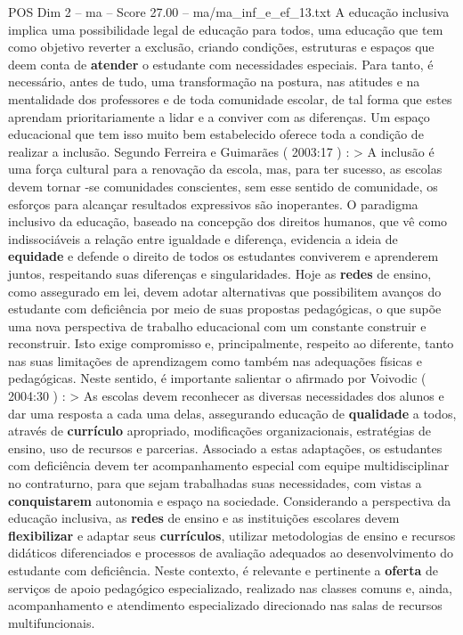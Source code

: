 \begin{textsample}{POS Dim 2 – ma – Score 27.00 – ma/ma\_inf\_e\_ef\_13.txt}
A educação inclusiva implica uma possibilidade legal de educação para todos, uma educação que tem como objetivo reverter a exclusão, criando condições, estruturas e espaços que deem conta de \textbf{atender} o estudante com necessidades especiais.
Para tanto, é necessário, antes de tudo, uma transformação na postura, nas atitudes e na mentalidade dos professores e de toda comunidade escolar, de tal forma que estes aprendam prioritariamente a lidar e a conviver com as diferenças.
Um espaço educacional que tem isso muito bem estabelecido oferece toda a condição de realizar a inclusão.
Segundo Ferreira e Guimarães ( 2003:17 ) : > A inclusão é uma força cultural para a renovação da escola, mas, para ter sucesso, as escolas devem tornar -se comunidades conscientes, sem esse sentido de comunidade, os esforços para alcançar resultados expressivos são inoperantes.
O paradigma inclusivo da educação, baseado na concepção dos direitos humanos, que vê como indissociáveis a relação entre igualdade e diferença, evidencia a ideia de \textbf{equidade} e defende o direito de todos os estudantes conviverem e aprenderem juntos, respeitando suas diferenças e singularidades.
Hoje as \textbf{redes} de ensino, como assegurado em lei, devem adotar alternativas que possibilitem avanços do estudante com deficiência por meio de suas propostas pedagógicas, o que supõe uma nova perspectiva de trabalho educacional com um constante construir e reconstruir.
Isto exige compromisso e, principalmente, respeito ao diferente, tanto nas suas limitações de aprendizagem como também nas adequações físicas e pedagógicas.
Neste sentido, é importante salientar o afirmado por Voivodic ( 2004:30 ) : > As escolas devem reconhecer as diversas necessidades dos alunos e dar uma resposta a cada uma delas, assegurando educação de \textbf{qualidade} a todos, através de \textbf{currículo} apropriado, modificações organizacionais, estratégias de ensino, uso de recursos e parcerias.
Associado a estas adaptações, os estudantes com deficiência devem ter acompanhamento especial com equipe multidisciplinar no contraturno, para que sejam trabalhadas suas necessidades, com vistas a \textbf{conquistarem} autonomia e espaço na sociedade.
Considerando a perspectiva da educação inclusiva, as \textbf{redes} de ensino e as instituições escolares devem \textbf{flexibilizar} e adaptar seus \textbf{currículos}, utilizar metodologias de ensino e recursos didáticos diferenciados e processos de avaliação adequados ao desenvolvimento do estudante com deficiência.
Neste contexto, é relevante e pertinente a \textbf{oferta} de serviços de apoio pedagógico especializado, realizado nas classes comuns e, ainda, acompanhamento e atendimento especializado direcionado nas salas de recursos multifuncionais.

\end{textsample}
